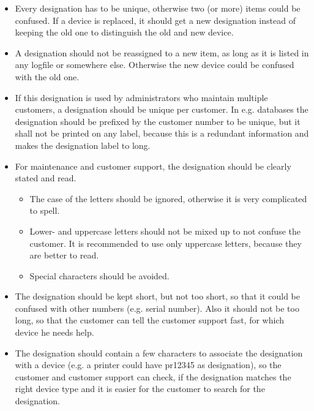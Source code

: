 \begin{itemize}
	\item Every designation has to be unique, otherwise two (or more) items
		could be confused. If a device is replaced, it should get a new
		designation instead of keeping the old one to distinguish the old and
		new device.

	\item A designation should not be reassigned to a new item, as long as it is
		listed in any logfile or somewhere else. Otherwise the new device could
		be confused with the old one.

	\item If this designation is used by administrators who maintain multiple
		customers, a designation should be unique per customer. In e.g.
		databases the designation should be prefixed by the customer number to
		be unique, but it shall not be printed on any label, because this is
		a redundant information and makes the designation label to long.

	\item For maintenance and customer support, the designation should be
		clearly stated and read.
		\begin{itemize}
			\item The case of the letters should be ignored, otherwise it is
				very complicated to spell.

			\item Lower- and uppercase letters should not be mixed up to not
				confuse the customer. It is recommended to use only uppercase
				letters, because they are better to read.

			\item Special characters should be avoided.
		\end{itemize}

	\item The designation should be kept short, but not too short, so that it
		could be confused with other numbers (e.g. serial number). Also it
		should not be too long, so that the customer can tell the customer
		support fast, for which device he needs help.

	\item The designation should contain a few characters to associate the
		designation with a device (e.g. a printer could have pr12345 as
		designation), so the customer and customer support can check, if the
		designation matches the right device type and it is easier for the
		customer to search for the designation.
\end{itemize}
